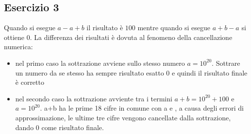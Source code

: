\subsection{Esercizio 3}
Quando si esegue $a-a+b$ il risultato è $100$ mentre quando si esegue $a+b-a$ si ottiene $0$. La differenza dei risultati è dovuta al fenomeno della cancellazione
numerica:
\begin{itemize}
    \item nel primo caso la sottrazione avviene sullo stesso numero $a=10^{20}$. Sottrare un numero da se stesso ha sempre risultato esatto $0$ e quindi il risultato finale è corretto
    \item nel secondo caso la sottrazione avviente tra i termini $a+b = 10^{20} + 100$ e $a = 10^{20}$. a+b ha le prime 18 cifre in comune con a e , a causa degli errori di approssimazione, le ultime tre cifre
    vengono cancellate dalla sottrazione, dando 0 come risultato finale.
\end{itemize}